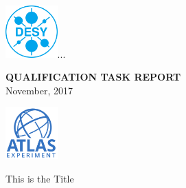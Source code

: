 \begin{titlepage}
	\centering
	\includegraphics[width=0.15\textwidth]{Figures/Logos/DESY-Logo-cyan-RGB_ger.jpg}...
	\hfill
	\begin{minipage}[ct!]{0.6\linewidth}
		\centering
		\vspace{-2cm}
		\Large\textbf {QUALIFICATION TASK REPORT}\\
		\large {November, 2017}
	\end{minipage}
	\hfill
	\includegraphics[width=0.15\textwidth]{Figures/Logos/AT_atlaslogo_2015.pdf}

	\vspace{1.5cm}

	This is the Title

		
		
\end{titlepage}